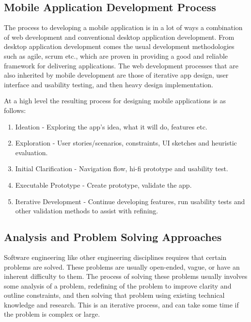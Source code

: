 \documentclass[11pt,english,numbers=endperiod,parskip=half]{scrartcl}
\begin{document}
  \subsection{Mobile Application Development Process}
    The process to developing a mobile application is in a lot of ways a
    combination of web development and conventional desktop application development.
    From desktop application development comes the usual development methodologies
    such as agile, scrum etc., which are proven in providing a good and reliable
    framework for delivering applications. The web development processes that
    are also inherited by mobile development are those of iterative app design,
    user interface and usability testing, and then heavy design implementation.

    At a high level the resulting process for designing mobile applications is
    as follows:
    \begin{enumerate}
      \item{
        Ideation - Exploring the app's idea, what it will do, features etc.
      }
      \item{
        Exploration - User stories/scenarios, constraints, UI sketches and
        heuristic evaluation.
      }
      \item{
        Initial Clarification - Navigation flow, hi-fi prototype and usability
        test.
      }
      \item{
        Executable Prototype - Create prototype, validate the app.
      }
      \item{
        Iterative Development - Continue developing features, run usability
        tests and other validation methods to assist with refining.
      }
    \end{enumerate}
  \subsection{Analysis and Problem Solving Approaches}

    Software engineering like other engineering disciplines requires that
    certain problems are solved. These problems are usually open-ended, vague,
    or have an inherent difficulty to them. The process of solving these problems
    usually involves some analysis of a problem, redefining of the problem to
    improve clarity and outline constraints, and then solving that problem using
    existing technical knowledge and research. This is an iterative process, and
    can take some time if the problem is complex or large.
\end{document}
